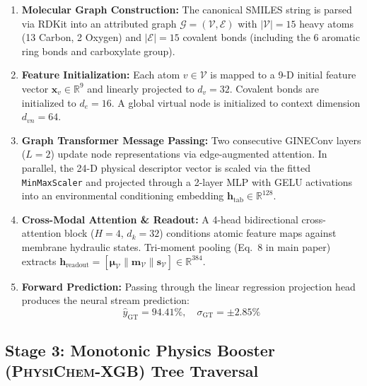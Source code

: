 \documentclass[11pt]{article}
\begin{document}
\begin{enumerate}[leftmargin=1.0cm]
    \item \textbf{Molecular Graph Construction:} The canonical SMILES string is parsed via RDKit into an attributed graph $\mathcal{G} = (\mathcal{V}, \mathcal{E})$ with $|\mathcal{V}| = 15$ heavy atoms (13 Carbon, 2 Oxygen) and $|\mathcal{E}| = 15$ covalent bonds (including the 6 aromatic ring bonds and carboxylate group).
    \item \textbf{Feature Initialization:} Each atom $v \in \mathcal{V}$ is mapped to a 9-D initial feature vector $\mathbf{x}_v \in \mathbb{R}^9$ and linearly projected to $d_v = 32$. Covalent bonds are initialized to $d_e = 16$. A global virtual node is initialized to context dimension $d_{vn} = 64$.
    \item \textbf{Graph Transformer Message Passing:} Two consecutive GINEConv layers ($L = 2$) update node representations via edge-augmented attention. In parallel, the 24-D physical descriptor vector is scaled via the fitted \texttt{MinMaxScaler} and projected through a 2-layer MLP with GELU activations into an environmental conditioning embedding $\mathbf{h}_{\mathrm{tab}} \in \mathbb{R}^{128}$.
    \item \textbf{Cross-Modal Attention \& Readout:} A 4-head bidirectional cross-attention block ($H = 4$, $d_k = 32$) conditions atomic feature maps against membrane hydraulic states. Tri-moment pooling (Eq.~8 in main paper) extracts $\mathbf{h}_{\mathrm{readout}} = [\boldsymbol{\mu}_{\mathcal{V}} \parallel \mathbf{m}_{\mathcal{V}} \parallel \mathbf{s}_{\mathcal{V}}] \in \mathbb{R}^{384}$.
    \item \textbf{Forward Prediction:} Passing through the linear regression projection head produces the neural stream prediction:
    \begin{equation}
    \hat{y}_{\mathrm{GT}} = 94.41\%, \quad \sigma_{\mathrm{GT}} = \pm 2.85\%
    \end{equation}
\end{enumerate}

\subsection{Stage 3: Monotonic Physics Booster (\textsc{PhysiChem-XGB}) Tree Traversal}
\label{sec:walkthrough_xgb}
\end{document}
